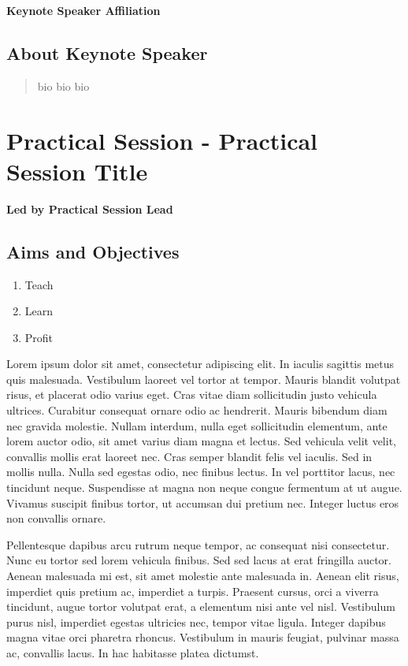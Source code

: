 \documentclass[12pt,]{book}
\providecommand{\tightlist}{%
  \setlength{\itemsep}{0pt}\setlength{\parskip}{0pt}}
\begin{document}
\textbf{Keynote Speaker Affiliation}

\subsection*{About Keynote Speaker}\label{about-keynote-speaker-1}

\begin{quote}
bio bio bio
\end{quote}

\section*{Practical Session - Practical Session
Title}\label{practical-session---practical-session-title-1}

\textbf{Led by Practical Session Lead}

\subsection*{Aims and Objectives}\label{aims-and-objectives-5}

\begin{enumerate}
\def\labelenumi{\arabic{enumi}.}
\tightlist
\item
  Teach
\item
  Learn
\item
  Profit
\end{enumerate}

Lorem ipsum dolor sit amet, consectetur adipiscing elit. In iaculis
sagittis metus quis malesuada. Vestibulum laoreet vel tortor at tempor.
Mauris blandit volutpat risus, et placerat odio varius eget. Cras vitae
diam sollicitudin justo vehicula ultrices. Curabitur consequat ornare
odio ac hendrerit. Mauris bibendum diam nec gravida molestie. Nullam
interdum, nulla eget sollicitudin elementum, ante lorem auctor odio, sit
amet varius diam magna et lectus. Sed vehicula velit velit, convallis
mollis erat laoreet nec. Cras semper blandit felis vel iaculis. Sed in
mollis nulla. Nulla sed egestas odio, nec finibus lectus. In vel
porttitor lacus, nec tincidunt neque. Suspendisse at magna non neque
congue fermentum at ut augue. Vivamus suscipit finibus tortor, ut
accumsan dui pretium nec. Integer luctus eros non convallis ornare.

Pellentesque dapibus arcu rutrum neque tempor, ac consequat nisi
consectetur. Nunc eu tortor sed lorem vehicula finibus. Sed sed lacus at
erat fringilla auctor. Aenean malesuada mi est, sit amet molestie ante
malesuada in. Aenean elit risus, imperdiet quis pretium ac, imperdiet a
turpis. Praesent cursus, orci a viverra tincidunt, augue tortor volutpat
erat, a elementum nisi ante vel nisl. Vestibulum purus nisl, imperdiet
egestas ultricies nec, tempor vitae ligula. Integer dapibus magna vitae
orci pharetra rhoncus. Vestibulum in mauris feugiat, pulvinar massa ac,
convallis lacus. In hac habitasse platea dictumst.
\end{document}

